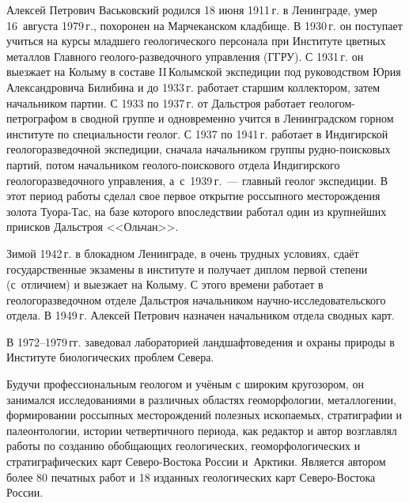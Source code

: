 



\makeProcTitleII
{}


Алексей Петрович Васьковский родился 18 июня 1911\,г. в Ленинграде, умер 16~августа 1979\,г., похоронен на Марчеканском кладбище. В 1930\,г. он поступает учиться на курсы младшего геологического персонала при Институте цветных металлов Главного геолого-разведочного управления \mbox{(ГГРУ)}. С 1931\,г. он выезжает на Колыму в составе II\,Колымской экспедиции под руководством Юрия Александровича Билибина и до 1933\,г. работает старшим коллектором, затем начальником партии. С 1933 по 1937\,г. от Дальстроя работает геологом-петрографом в сводной группе и одновременно учится в Ленинградском горном институте по специальности геолог. С 1937 по 1941\,г. работает в Индигирской геологоразведочной экспедиции, сначала начальником группы рудно-поисковых партий, потом начальником геолого-поискового отдела Индигирского геологоразведочного управления, а~с~1939\,г.~--- главный геолог экспедиции. В этот период работы сделал свое первое открытие россыпного месторождения золота Туора-Тас, на базе которого впоследствии работал один из крупнейших приисков Дальстроя <<Ольчан>>.

Зимой 1942\,г. в блокадном Ленинграде, в очень трудных условиях, сдаёт государственные экзамены в институте и получает диплом первой степени (с~отличием) и выезжает на Колыму. С этого времени работает в геологоразведочном отделе Дальстроя начальником научно-исследовательского отдела. В 1949\,г. Алексей Петрович назначен начальником отдела сводных карт.

В 1972--1979\,гг. заведовал лабораторией ландшафтоведения и охраны природы в Институте биологических проблем Севера.

Будучи профессиональным геологом и учёным с широким кругозором, он занимался исследованиями в различных областях геоморфологии, металлогении, формировании россыпных месторождений полезных ископаемых, стратиграфии и палеонтологии, истории четвертичного периода, как редактор и автор возглавлял работы по созданию обобщающих геологических, геоморфологических и стратиграфических карт Северо-Востока России и~Арктики. Является автором более 80 печатных работ и 18 изданных геологических карт Северо-Востока России.

